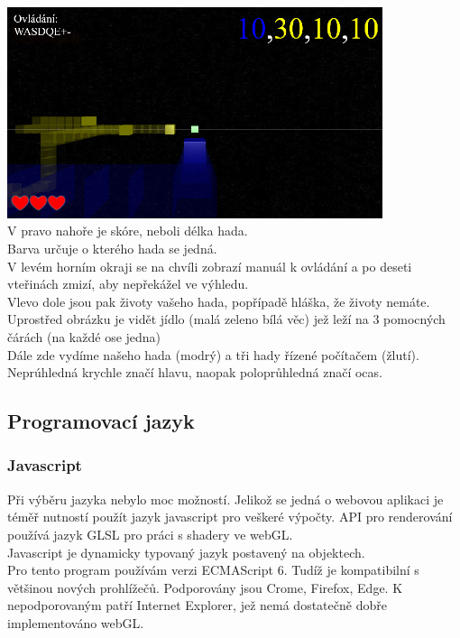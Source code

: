 \documentclass[a4paper,titlepage]{article}
\begin{document}
		\includegraphics[width=11cm]{screen.jpg}
		\\		
		V pravo nahoře je skóre, neboli délka hada.\\
		Barva určuje o kterého hada se jedná.\\
		V levém horním okraji se na chvíli zobrazí manuál k ovládání a
		po deseti vteřinách zmizí, aby nepřekážel ve výhledu.\\
		Vlevo dole jsou pak životy vašeho hada, popřípadě hláška, že životy nemáte.\\
		Uprostřed obrázku je vidět jídlo (malá zeleno bílá věc) jež leží na 3 pomocných čárách
		(na každé ose jedna)\\
		Dále zde vydíme našeho hada (modrý) a tři hady řízené počítačem (žlutí).
		Neprúhledná krychle značí hlavu, naopak poloprůhledná značí ocas.
		
				
		
	\subsection{Programovací jazyk}
	\subsubsection{Javascript\cite{JavaScript-wikipedie}}
		Při výběru jazyka nebylo moc možností. Jelikož se jedná o webovou
		aplikaci je téměř nutností použít jazyk javascript pro veškeré výpočty.
		API pro renderování používá jazyk GLSL pro práci s shadery ve webGL.\\
		Javascript je dynamicky typovaný jazyk postavený na objektech.\\
		Pro tento program používám verzi ECMAScript 6.
		Tudíž je kompatibilní s většinou nových prohlížečů.
		Podporovány jsou Crome, Firefox, Edge.
		K nepodporovaným patří Internet Explorer, jež nemá dostatečně dobře implementováno webGL\cite{webGL}.
\end{document}
